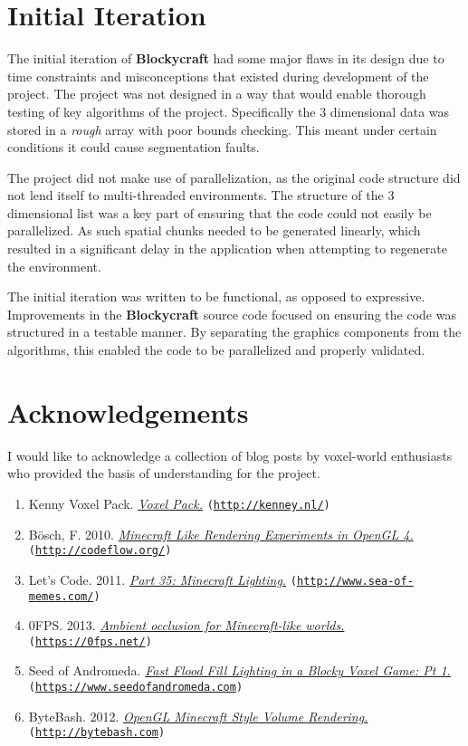 \documentclass{book}
\newcommand{\Blockycraft}{\textbf{Blockycraft}}
\begin{document}
\section{Initial Iteration}
The initial iteration of \Blockycraft{} had some major flaws in its design due to time constraints and misconceptions that existed during development of the project.  The project was not designed in a way that would enable thorough testing of key algorithms of the project.  Specifically the 3 dimensional data was stored in a \textit{rough} array with poor bounds checking.  This meant under certain conditions it could cause segmentation faults.   

The project did not make use of parallelization, as the original code structure did not lend itself to multi-threaded environments.  The structure of the 3 dimensional list was a key part of ensuring that the code could not easily be parallelized.  As such spatial chunks needed to be generated linearly, which resulted in a significant delay in the application when attempting to regenerate the environment.

The initial iteration was written to be functional, as opposed to expressive.  Improvements in the \Blockycraft{} source code focused on ensuring the code was structured in a testable manner.  By separating the graphics components from the algorithms, this enabled the code to be parallelized and properly validated.

\section{Acknowledgements}
I would like to acknowledge a collection of blog posts by voxel-world enthusiasts who provided the basis of understanding for the project.

\begin{enumerate}
	\item Kenny Voxel Pack. {\em \href{http://kenney.nl/assets/voxel-pack}{Voxel Pack.}} \texttt{(\url{http://kenney.nl/})}
	\item Bösch, F. 2010. {\em \href{http://codeflow.org/entries/2010/dec/09/minecraft-like-rendering-experiments-in-opengl-4/#ambient-occlusion}{Minecraft Like Rendering Experiments in OpenGL 4.}} \texttt{(\url{http://codeflow.org/})}
	\item Let's Code. 2011. {\em \href{http://www.sea-of-memes.com/LetsCode35/LetsCode35.html}{Part 35: Minecraft Lighting.}} \texttt{(\url{http://www.sea-of-memes.com/})}
	\item 0FPS. 2013. {\em \href{https://0fps.net/2013/07/03/ambient-occlusion-for-minecraft-like-worlds/}{Ambient occlusion for Minecraft-like worlds.}} \texttt{(\url{https://0fps.net/})}
	\item Seed of Andromeda. {\em \href{https://www.seedofandromeda.com/blogs/29-fast-flood-fill-lighting-in-a-blocky-voxel-game-pt-1/}{Fast Flood Fill Lighting in a Blocky Voxel Game: Pt 1.}} \texttt{(\url{https://www.seedofandromeda.com})}
	\item ByteBash. 2012. {\em \href{http://bytebash.com/2012/03/opengl-volume-rendering/}{OpenGL Minecraft Style Volume Rendering.}} \texttt{(\url{http://bytebash.com})}
\end{enumerate}
\end{document}
